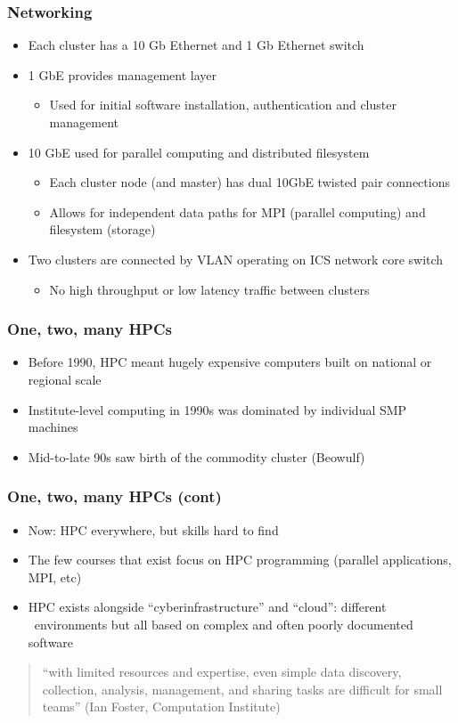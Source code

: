 \documentclass[handout]{beamer}
\begin{document}
\begin{frame}
\frametitle{Networking}
\begin{itemize}
\item Each cluster has a 10 Gb Ethernet and 1 Gb Ethernet switch
\item 1 GbE provides management layer
\begin{itemize}
\item Used for initial software installation, authentication and cluster management
\end{itemize}
\item 10 GbE used for parallel computing and distributed filesystem
\begin{itemize}
\item Each cluster node (and master) has dual 10GbE twisted pair connections
\item Allows for independent data paths for MPI (parallel computing) and filesystem (storage)
\end{itemize}
\item Two clusters are connected by VLAN operating on ICS network core switch
\begin{itemize}
\item No high throughput or low latency traffic between clusters
\end{itemize}
\end{itemize}
\end{frame}

\begin{frame}
\frametitle{One, two, many HPCs}
\begin{itemize}
  \item Before 1990, HPC meant hugely expensive computers built on national or
  regional scale
  \item Institute-level computing in 1990s was dominated by individual SMP
  machines
  \item Mid-to-late 90s saw birth of the commodity cluster (Beowulf)
\end{itemize}
\end{frame}

\begin{frame}
\frametitle{One, two, many HPCs (cont)}
\begin{itemize}
  \item Now: HPC everywhere, but skills hard to find
  \item The few courses that exist focus on HPC programming (parallel
  applications, MPI, etc)
  \item HPC exists alongside ``cyberinfrastructure'' and ``cloud'': different
\  environments but all based on complex and often poorly documented software
\end{itemize}
\begin{quote}
``with limited resources and expertise, even simple data discovery, collection,
analysis, management, and sharing tasks are difficult for small teams'' (Ian
Foster, Computation Institute)
\end{quote}
\end{frame}
\end{document}
